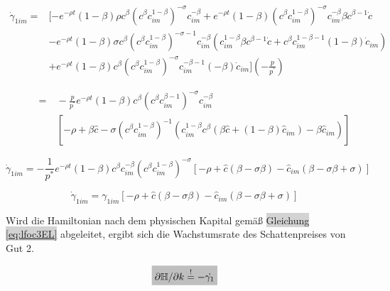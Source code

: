 	\begin{equation*}
		\begin{split}
			\dot{\gamma}_{1im} = &[- e^{- \rho t} (1- \beta) \rho c^{ \beta} ( c^{ \beta} c_{im}^{1- \beta})^{- \sigma} c_{im}^{- \beta} + e^{ - \rho t} (1- \beta)(c^{ \beta} c_{im}^{1- \beta})^{- \sigma} c_{im}^{-\beta} \beta c^{ \beta - 1} \dot{c}\\
			& - e^{- \rho t} (1 - \beta) \sigma c^{ \beta} (c^{ \beta} c_{im}^{1- \beta})^{- \sigma - 1} c_{im}^{- \beta}(c_{im}^{1- \beta} \beta c^{ \beta -1} \dot{c} + c^{ \beta} c_{im}^{1- \beta -1} (1- \beta) \dot{c}_{im}) \\
			& + e^{- \rho t} (1- \beta) c^{ \beta} ( c^{ \beta} c_{im}^{1- \beta})^{- \sigma} c_{im}^{- \beta -1}(- \beta) \dot{c}_{im} ] (-\frac{p}{p^{^*}})
		\end{split}
	\end{equation*}


	\begin{equation*}
		\begin{split}
			\qquad=&~-\frac{p}{p^{^*}} e^{- \rho t} (1- \beta) c^{\beta}(c^{\beta} c_{im}^{\beta -1})^{- \sigma} c_{im}^{- \beta}\\
			&~\left[-\rho + \beta \hat{c} - \sigma(c^{\beta} c_{im}^{1- \beta})^{-1}(c_{im}^{1- \beta} c^{\beta}(\beta \hat{c} + (1- \beta) \hat{c}_{im}) - \beta \hat{c}_{im})\right]
		\end{split}
	\end{equation*}


	\begin{equation}
		\dot{\gamma}_{1im}=-\frac{1}{p^*}e^{-\rho t}(1-\beta) c^{\beta}c_{im}^{-\beta}(c^\beta c_{im}^{1-\beta})^{-\sigma}[-\rho+\hat{c}(\beta-\sigma\beta)-\hat{c}_{im}(\beta-\sigma\beta+\sigma)]\label{eq:lfoc1cim}
	\end{equation}


	\begin{equation}
		\dot{\gamma}_{1im}=\gamma_{1im}[-\rho+\hat{c}(\beta-\sigma\beta)-\hat{c}_{im}(\beta-\sigma\beta+\sigma)]\label{eq:foc1cimEL}
	\end{equation}


Wird die Hamiltonian nach dem physischen Kapital gemä{\ss} \colorbox{lightgray}{Gleichung \eqref{eq:lfoc3EL}} abgeleitet, ergibt sich die Wachstumsrate des Schattenpreises von Gut 2.


	\begin{equation*}
		\colorbox{lightgray}{$\partial\mathbb{H}/\partial k\overset{!}{=}-\dot{\gamma_1}$}
	\end{equation*}



